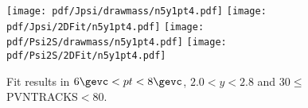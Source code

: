 \begin{figure}[H]
\begin{center}
\texttt{[image: pdf/Jpsi/drawmass/n5y1pt4.pdf]}
\texttt{[image: pdf/Jpsi/2DFit/n5y1pt4.pdf]}
\vspace*{-0.5cm}
\texttt{[image: pdf/Psi2S/drawmass/n5y1pt4.pdf]}
\texttt{[image: pdf/Psi2S/2DFit/n5y1pt4.pdf]}
\vspace*{-0.5cm}
\end{center}
\caption{Fit results in $6\gevc<pt<8\gevc$, $2.0<y<2.8$ and 30$\leq$PVNTRACKS$<$80.}
\label{Fitn5y1pt4}
\end{figure}
